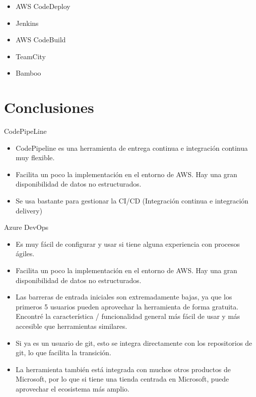 \documentclass[12pt,letterpaper]{article}
\begin{document}
\begin{itemize}
    \item AWS CodeDeploy
    \item Jenkins
    \item AWS CodeBuild
    \item TeamCity
    \item Bamboo

\end{itemize}
\section{Conclusiones}
CodePipeLine
\begin{itemize}
    \item CodePipeline es una herramienta de entrega continua e integración continua muy flexible.
    \item Facilita un poco la implementación en el entorno de AWS. Hay una gran disponibilidad de datos no estructurados.
    \item Se usa bastante para gestionar la CI/CD (Integración continua e integración delivery)
    
\end{itemize}
Azure DevOps
\begin{itemize}
    \item Es muy fácil de configurar y usar si tiene alguna experiencia con procesos ágiles.     \item Facilita un poco la implementación en el entorno de AWS. Hay una gran disponibilidad de datos no estructurados.
    \item Las barreras de entrada iniciales son extremadamente bajas, ya que los primeros 5 usuarios pueden aprovechar la herramienta de forma gratuita. Encontré la característica / funcionalidad general más fácil de usar y más accesible que herramientas similares. 
    \item Si ya es un usuario de git, esto se integra directamente con los repositorios de git, lo que facilita la transición. 
    \item La herramienta también está integrada con muchos otros productos de Microsoft, por lo que si tiene una tienda centrada en Microsoft, puede aprovechar el ecosistema más amplio.
\end{itemize}
\end{document}
